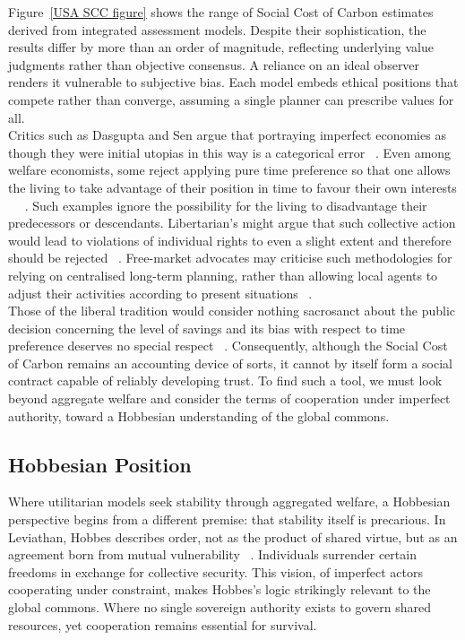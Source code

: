 \documentclass[10pt, oneside]{article}   	%
\begin{document}
Figure~\ref{USA SCC figure} shows the range of Social Cost of Carbon estimates derived from integrated assessment models.
Despite their sophistication, the results differ by more than an order of magnitude, reflecting underlying value judgments rather than objective consensus.
A reliance on an ideal observer renders it vulnerable to subjective bias.
Each model embeds ethical positions that compete rather than converge, assuming a single planner can prescribe values for all.\\

Critics such as Dasgupta and Sen argue that portraying imperfect economies as though they were initial utopias in this way is a categorical error ~\cite{as1}.
Even among welfare economists, some reject applying pure time preference so that one allows the living to take advantage of their position in time to favour their own interests ~\cite{hs1} ~\cite{fr1}.
Such examples ignore the possibility for the living to disadvantage their predecessors or descendants.
Libertarian's might argue that such collective action would lead to violations of individual rights to even a slight extent and therefore should be rejected ~\cite{rn1}.
Free-market advocates may criticise such methodologies for relying on centralised long-term planning, rather than allowing local agents to adjust their activities according to present situations ~\cite{fh1}.\\

Those of the liberal tradition would consider nothing sacrosanct about the public decision concerning the level of savings and its bias with respect to time preference deserves no special respect ~\cite{jr1}.
Consequently, although the Social Cost of Carbon remains an accounting device of sorts, it cannot by itself form a social contract capable of reliably developing trust.
To find such a tool, we must look beyond aggregate welfare and consider the terms of cooperation under imperfect authority, toward a Hobbesian understanding of the global commons.\\

\subsection{Hobbesian Position}

Where utilitarian models seek stability through aggregated welfare, a Hobbesian perspective begins from a different premise: that stability itself is precarious.
In Leviathan, Hobbes describes order, not as the product of shared virtue, but as an agreement born from mutual vulnerability ~\cite{th1}.
Individuals surrender certain freedoms in exchange for collective security.
This vision, of imperfect actors cooperating under constraint, makes Hobbes’s logic strikingly relevant to the global commons.
Where no single sovereign authority exists to govern shared resources, yet cooperation remains essential for survival.\\
\end{document}
